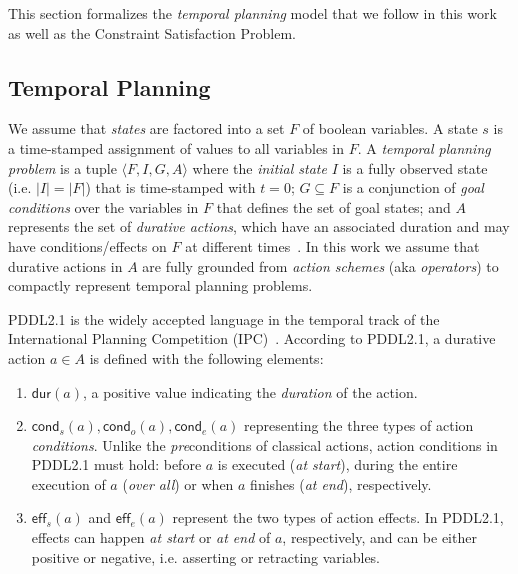 \documentclass{ecai}
\newcommand{\tup}[1]{{\langle #1 \rangle}}
\newcommand{\eff}{\mathsf{eff}}    %
\newcommand{\cond}{\mathsf{cond}}  %
\newcommand{\dur}{\mathsf{dur}}    %
\begin{document}
This section formalizes the {\em temporal planning} model that we follow in this work as well as the Constraint Satisfaction Problem.

\subsection{Temporal Planning}
\label{sec:temporalplanning}

We assume that {\em states} are factored into a set $F$ of boolean variables. A state $s$ is a time-stamped assignment of values to all variables in $F$. 
A {\em temporal planning problem} is a tuple $\tup{F,I,G,A}$ where the {\em initial state} $I$ is a fully observed state (i.e. $|I|=|F|$) that is time-stamped with $t=0$; $G \subseteq F$ is a conjunction of {\em goal conditions} over the variables in $F$ that defines the set of goal states; and $A$ represents the set of {\em durative actions}, which have an associated duration and may have conditions/effects on $F$ at different times~\cite{garrido2009constraint,vidal2006branching}.
In this work we assume that durative actions in $A$ are fully grounded from {\em action schemes} (aka {\em operators}) to compactly represent temporal planning problems. 

PDDL2.1 is the widely accepted language in the temporal track of the International Planning Competition (IPC)~\cite{fox2003pddl2,ghallab2004automated}. According to PDDL2.1, a durative action $a\in A$ is defined with the following elements:

\begin{enumerate}
\item $\dur(a)$, a positive value indicating the {\em duration} of the action.

\item $\cond_s(a), \cond_o(a), \cond_e(a)$ representing the three types of action {\em conditions}. Unlike the \emph{pre}conditions of classical actions, action conditions in PDDL2.1 must hold: before $a$ is executed ({\em at start}), during the entire execution of $a$ ({\em over all}) or when $a$ finishes ({\em at end}), respectively. 

\item $\eff_s(a)$ and $\eff_e(a)$ represent the two types of action effects. In PDDL2.1, effects can happen {\em at start} or {\em at end} of $a$, respectively, and can be either positive or negative, i.e. asserting or retracting variables. 

\end{enumerate}
\end{document}
